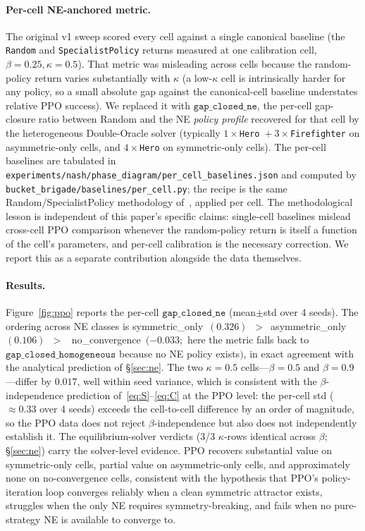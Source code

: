 \documentclass{anvil-paper}
\begin{document}
\paragraph{Per-cell NE-anchored metric.}
The original v1 sweep scored every cell against a single canonical baseline
(the \texttt{Random} and \texttt{SpecialistPolicy} returns measured at one
calibration cell, $\beta{=}0.25,\kappa{=}0.5$). That metric was misleading
across cells because the random-policy return varies substantially with
$\kappa$ (a low-$\kappa$ cell is intrinsically harder for any policy, so a
small absolute gap against the canonical-cell baseline understates relative
PPO success). We replaced it with $\texttt{gap\_closed\_ne}$, the per-cell
gap-closure ratio between Random and the NE \emph{policy profile}
recovered for that cell by the heterogeneous Double-Oracle solver
(typically $1\times$\texttt{Hero}~$+~3\times$\texttt{Firefighter} on
asymmetric-only cells, and $4\times$\texttt{Hero} on symmetric-only cells).
The per-cell baselines are tabulated in
\texttt{experiments/nash/phase\_diagram/per\_cell\_baselines.json} and
computed by \texttt{bucket\_brigade/baselines/per\_cell.py}; the recipe is
the same Random/SpecialistPolicy methodology of~\citep{bbnestructure},
applied per cell. The methodological lesson is independent of this paper's
specific claims: single-cell baselines mislead cross-cell PPO comparison
whenever the random-policy return is itself a function of the cell's
parameters, and per-cell calibration is the necessary correction. We report
this as a separate contribution alongside the data themselves.

\paragraph{Results.}
Figure~\ref{fig:ppo} reports the per-cell $\texttt{gap\_closed\_ne}$
(mean$\pm$std over 4 seeds). The ordering across NE classes is
\textsf{symmetric\_only}~$(0.326)$~$>$~\textsf{asymmetric\_only}~$(0.106)$~$>$~%
\textsf{no\_convergence}~$(-0.033;$ here the metric falls back to
$\texttt{gap\_closed\_homogeneous}$ because no NE policy exists$)$, in
exact agreement with the analytical prediction of \S\ref{sec:ne}. The
two $\kappa{=}0.5$ cells---$\beta{=}0.5$ and $\beta{=}0.9$---differ by
$0.017$, well within seed variance, which is consistent with the
$\beta$-independence prediction of~\eqref{eq:S}--\eqref{eq:C} at the
PPO level: the per-cell std ($\approx 0.33$ over 4 seeds) exceeds the
cell-to-cell difference by an order of magnitude, so the PPO data does
not reject $\beta$-independence but also does not independently
establish it. The equilibrium-solver verdicts (3/3 $\kappa$-rows
identical across $\beta$; \S\ref{sec:ne}) carry the solver-level
evidence. PPO recovers
substantial value on symmetric-only cells, partial value on asymmetric-only
cells, and approximately none on no-convergence cells, consistent with the
hypothesis that PPO's policy-iteration loop converges reliably when a clean
symmetric attractor exists, struggles when the only NE requires
symmetry-breaking, and fails when no pure-strategy NE is available to
converge to.
\end{document}
